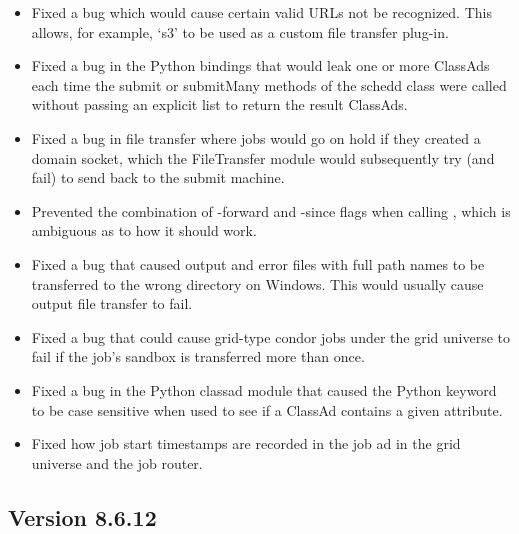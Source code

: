 \begin{itemize}

\item Fixed a bug which would cause certain valid URLs not be recognized.  This
allows, for example, `s3' to be used as a custom file transfer plug-in.

\item Fixed a bug in the Python bindings that would leak one or more ClassAds each time
the submit or submitMany methods of the schedd class were called without passing an explicit list to
return the result ClassAds.

\item Fixed a bug in file transfer where jobs would go on hold if they created
a domain socket, which the FileTransfer module would subsequently try (and fail) 
to send back to the submit machine.

\item Prevented the combination of -forward and -since flags when calling
, which is ambiguous as to how it should work.

\item Fixed a bug that caused output and error files with full path names
to be transferred to the wrong directory on Windows.  This would usually
cause output file transfer to fail.

\item Fixed a bug that could cause grid-type condor jobs under the grid
universe to fail if the job's sandbox is transferred more than once.

\item Fixed a bug in the Python classad module that caused the Python 
keyword to be case sensitive when used to see if a ClassAd contains a given attribute.

\item Fixed how job start timestamps are recorded in the job ad in the
grid universe and the job router.

\end{itemize}

\subsection*{\label{sec:New-8-6-12}Version 8.6.12}

